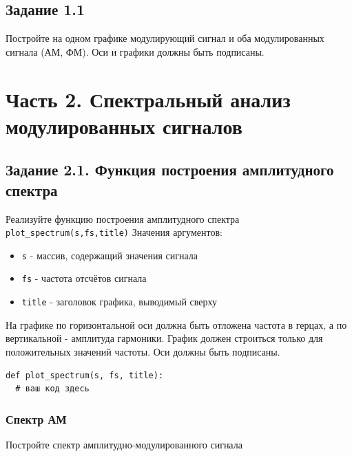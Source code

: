 \documentclass[12pt,a4paper,openany]{book}
\providecommand{\tightlist}{\setlength{\itemsep}{0pt}\setlength{\parskip}{0pt}}
\begin{document}
\subsection*{Задание 1.1}

Постройте на одном графике модулирующий сигнал и оба модулированных сигнала (АМ, ФМ). Оси и графики должны быть подписаны.

\section*{Часть 2. Спектральный анализ модулированных сигналов}

\subsection*{Задание 2.1. Функция построения амплитудного спектра}

Реализуйте функцию построения амплитудного спектра \texttt{plot\_\allowbreak{}spectrum(\allowbreak{}s,\allowbreak{}fs,\allowbreak{}title)}
Значения аргументов:

\begin{itemize}
\tightlist
\item
  \texttt{s} - массив, содержащий значения сигнала
\item
  \texttt{fs} - частота отсчётов сигнала
\item
  \texttt{title} - заголовок графика, выводимый сверху
\end{itemize}

На графике по горизонтальной оси должна быть отложена частота в герцах, а по вертикальной - амплитуда гармоники. График должен строиться только для положительных значений частоты. Оси должны быть подписаны.

\begin{Verbatim}[fontsize=\small, breaklines, breakanywhere, frame=single, framesep=2mm]
def plot_spectrum(s, fs, title):
  # ваш код здесь
\end{Verbatim}

\subsubsection*{Спектр АМ}

Постройте спектр амплитудно-модулированного сигнала
\end{document}
